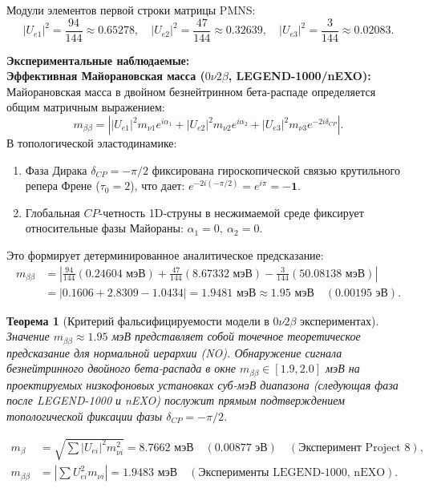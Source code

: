\documentclass[12pt,a4paper]{article}
\newtheorem{theorem}{Теорема}
\begin{document}
	Модули элементов первой строки матрицы PMNS:
	\begin{equation}
		|U_{e1}|^2 = \frac{94}{144} \approx 0.65278, \quad |U_{e2}|^2 = \frac{47}{144} \approx 0.32639, \quad |U_{e3}|^2 = \frac{3}{144} \approx 0.02083.
	\end{equation}
	
	\textbf{Экспериментальные наблюдаемые:\\ Эффективная Майорановская масса ($0\nu 2\beta$, LEGEND-1000/nEXO):}
	Майорановская масса в двойном безнейтринном бета-распаде определяется общим матричным выражением:
	\begin{equation}
		m_{\beta\beta} = \left| |U_{e1}|^2 m_{\nu 1} e^{i\alpha_1} + |U_{e2}|^2 m_{\nu 2} e^{i\alpha_2} + |U_{e3}|^2 m_{\nu 3} e^{-2i\delta_{CP}} \right|.
	\end{equation}
	В топологической эластодинамике:
	\begin{enumerate}
		\item Фаза Дирака $\delta_{CP} = -\pi/2$ фиксирована гироскопической связью крутильного репера Френе ($\tau_0 = 2$), что дает: $e^{-2i(-\pi/2)} = e^{i\pi} = \mathbf{-1}$.
		\item Глобальная $CP$-четность 1D-струны в несжимаемой среде фиксирует относительные фазы Майораны: $\alpha_1 = 0, \ \alpha_2 = 0$.
	\end{enumerate}
	Это формирует детерминированное аналитическое предсказание:
	\begin{align}
		m_{\beta\beta} &= \left| \frac{94}{144}(0.24604 \text{ мэВ}) + \frac{47}{144}(8.67332 \text{ мэВ}) - \frac{3}{144}(50.08138 \text{ мэВ}) \right| \nonumber \\
		&= |0.1606 + 2.8309 - 1.0434| = \mathbf{1.9481 \text{ мэВ}} \approx \mathbf{1.95 \text{ мэВ}} \quad (\mathbf{0.00195 \text{ эВ}}).
	\end{align}
	
	\begin{theorem}[Критерий фальсифицируемости модели в $0\nu 2\beta$ экспериментах]
		Значение $m_{\beta\beta} \approx 1.95$ мэВ представляет собой точечное теоретическое предсказание для нормальной иерархии (NO). Обнаружение сигнала безнейтринного двойного бета-распада в окне $m_{\beta\beta} \in [1.9, 2.0]$ мэВ на проектируемых низкофоновых установках суб-мэВ диапазона (следующая фаза после LEGEND-1000 и nEXO) послужит прямым подтверждением топологической фиксации фазы $\delta_{CP} = -\pi/2$.
	\end{theorem}
	\begin{align}
		m_\beta &= \sqrt{\sum |U_{ei}|^2 m_{\nu i}^2} = \mathbf{8.7662 \text{ мэВ}} \quad (0.00877 \text{ эВ}) \quad (\text{Эксперимент Project 8}), \\
		m_{\beta\beta} &= \left| \sum U_{ei}^2 m_{\nu i} \right| = \mathbf{1.9483 \text{ мэВ}} \quad (\text{Эксперименты LEGEND-1000, nEXO}).
	\end{align}
	
\end{document}
